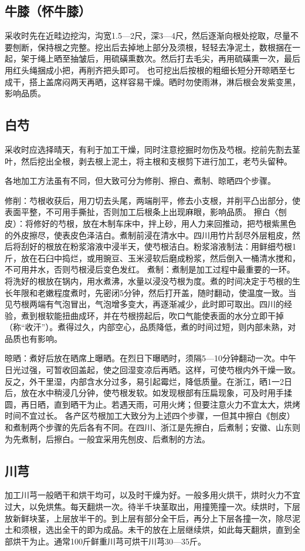 \documentclass{ctexbook}
\begin{document}
\subsection{牛膝（怀牛膝）}
采收时先在近畦边挖沟，沟宽1.5—2尺，深3—4尺，然后逐渐向根处挖取，尽量不要刨断，保持根之完整。挖出后去掉地上部分及须根，轻轻去净泥土，数根捆在一起，架于绳上晒至抽皱后，用硫磺熏数次。然后打去毛尖，再用硫磺熏一次，最后用红头绳捆成小把，再削齐把头即可。
也可挖出后按根的粗细长短分开晾晒至七成干，搭上盖席闷两天再晒，这样容易干燥。晒时勿使雨淋，淋后根会发紫变黑，影响品质。
\subsection{白芍}
采收时应选择晴天，有利于加工干燥，同时注意挖掘时勿伤及芍根。挖前先割去茎叶，然后挖出全根，剥去根上泥土，将主根和支根剪下进行加工，老芍头留种。

各地加工方法虽有不同，但大致可分为修削、擦白、煮制、晾晒四个步骤。

修削：芍根收获后，用刀切去头尾，两端削平，修去小支根，并削平凸出部分，使表面平整，不可用手撕扯，否则加工后根条上出现麻眼，影响品质。
擦白〈刨皮）：将修好的芍根，放在木制车床中，拌上砂，用人力来回推动，把芍根紫黑色的外皮擦尽，使表皮色泽洁白。煮制前浸在清水中。四川用竹片刮尽外层粗皮，然后将刮好的根放在粉浆溶液中浸半天，使芍根洁白。粉浆溶液制法：用鲜细芍根1斤，放在石臼中捣烂，或用豌豆、玉米浸软后磨成粉浆，然后倒入一桶清水搅和，不可用井水，否则芍根浸后变色发红。
煮制：煮制是加工过程中最重要的一环。将洗好的根放在锅内，用水煮沸，水量以浸没芍根为度。煮的时间决定于芍根的生长年限和老嫩程度煮时，先密闭5分钟，然后打开盖，随时翻动，使温度一致。当见芍根两端有气泡冒出，气泡增多变大，再逐渐减少，此时即可取出。四川的经验，煮到根软能扭曲成环，并在芍根捞起后，吹口气能使表面的水分立即干掉（称“收汗”）。煮得过久，内部空心，品质降低，煮的时间过短，则内部未熟，对品质也有影响。

晾晒：煮好后放在晒席上曝晒。在烈日下曝晒时，须隔5—10分钟翻动一次。中午日光过强，可暂收回盖起，使之回湿变凉后再晒。这样，可使芍根内外干燥一致。反之，外干里湿，内部含水分过多，易引起霉烂，降低质量。在浙江，晒1一2日后，放在水中稍浸几分钟，使芍根发软。如发现根部有压扁现象，可及时用手揉圆，再日晒，直到晒干为止。若遇天雨，可用火烤；但要注意火力不宜太大，烘烤时间不宜过长。
各产区芍根加工大致分为上述四个步骤，一但其中擦白《刨皮）和煮制两个步骤的先后各有不同。在四川、浙江是先擦白，后煮制；安徽、山东则为先煮制，后擦白。一般宜采用先刨皮、后煮制的方法。

\subsection{川芎}
加工川芎一般晒干和烘干均可，以及时干燥为好。一般多用火烘干，烘时火力不宜过大，以免烘焦。每天翻烘一次。待半千块茎取出，用撞篼撞一次。续烘时，下层放新鲜块茎，上层放半干的。到上层有部分全干后，再分上下层各撞一次，除尽泥土和须根，选出全干的即为成品。未干的放在上层继续烘，如此每天翻烘，直到全部烘干为止。通常100斤鲜重川芎可烘干川芎30—35斤。
\end{document}
